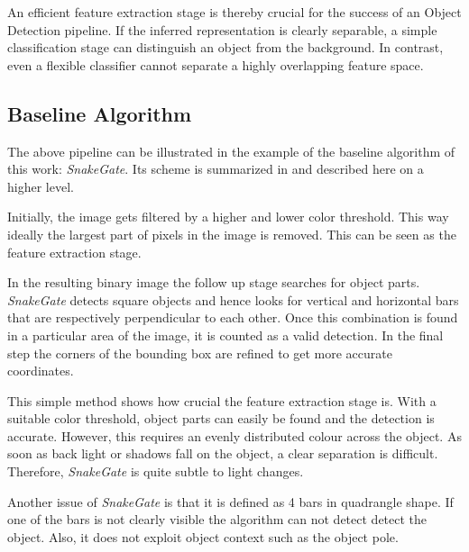 An efficient feature extraction stage is thereby crucial for the success of an Object Detection pipeline. If the inferred representation is clearly separable, a simple classification stage can distinguish an object from the background. In contrast, even a flexible classifier cannot separate a highly overlapping feature space.

\subsection{Baseline Algorithm}

The above pipeline can be illustrated in the example of the baseline algorithm of this work: \textit{SnakeGate}. Its scheme is summarized in  and described here on a higher level.

Initially, the image gets filtered by a higher and lower color threshold. This way ideally the largest part of pixels in the image is removed. This can be seen as the feature extraction stage.

In the resulting binary image the follow up stage searches for object parts. \textit{SnakeGate} detects square objects and hence looks for vertical and horizontal bars that are respectively perpendicular to each other. Once this combination is found in a particular area of the image, it is counted as a valid detection. In the final step the corners of the bounding box are refined to get more accurate coordinates.

This simple method shows how crucial the feature extraction stage is. With a suitable color threshold, object parts can easily be found and the detection is accurate. However, this requires an evenly distributed colour across the object. As soon as back light or shadows fall on the object, a clear separation is difficult. Therefore, \textit{SnakeGate} is quite subtle to light changes.

Another issue of \textit{SnakeGate} is that it is defined as 4 bars in quadrangle shape. If one of the bars is not clearly visible the algorithm can not detect detect the object. Also, it does not exploit object context such as the object pole.

